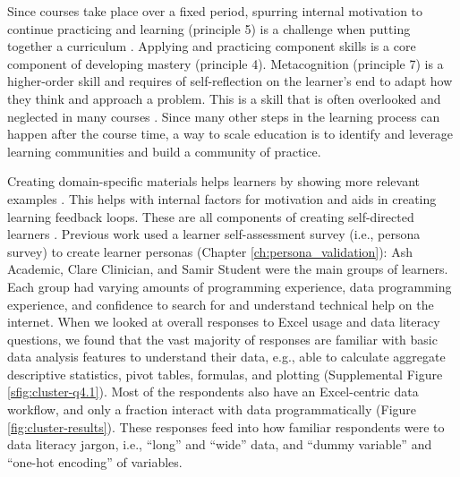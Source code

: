 \documentclass[030-workshop.tex]{subfiles}
\begin{document}
    Since courses take place over a fixed period,
    spurring internal motivation to continue practicing and learning (principle 5) is a challenge when putting together a curriculum
    \cite{ambrose2010learning}.
    Applying and practicing component skills is a core component of developing mastery (principle 4).
    Metacognition (principle 7) is a higher-order skill and requires of self-reflection on the learner's end
    to adapt how they think and approach a problem.
    This is a skill that is often overlooked and neglected in many courses
    \cite{ambrose2010learning}.
    Since many other steps in the learning process can happen after the course time,
    a way to scale education is to identify and leverage learning communities
    and build a community of practice. %

    Creating domain-specific materials helps learners by showing more relevant examples
    \cite{ambrose2010learning, Koch2016, wilson2019teaching, krossDemocratizationDataScience2020}.
    This helps with internal factors for motivation and aids in creating learning feedback loops.
    These are all components of creating self-directed learners
    \cite{ambrose2010learning, Koch2016, wilson2019teaching, krossDemocratizationDataScience2020}.
    Previous work used a learner self-assessment survey (i.e., persona survey) to create learner personas
    (Chapter \ref{ch:persona_validation}):
    Ash Academic, Clare Clinician, and Samir Student were the main groups of learners.
    Each group had varying amounts of
    programming experience, data programming experience, and
    confidence to search for and understand technical help on the internet.
    When we looked at overall responses to Excel usage and data literacy questions,
    we found that the vast majority of responses are familiar with basic data analysis features to understand their data,
    e.g., able to calculate aggregate descriptive statistics,
    pivot tables,
    formulas,
    and plotting
    (Supplemental Figure \ref{sfig:cluster-q4.1}).
    Most of the respondents also have an Excel-centric data workflow,
    and only a fraction interact with data programmatically
    (Figure \ref{fig:cluster-results}).
    These responses feed into how familiar respondents were to data literacy jargon, i.e., ``long'' and ``wide'' data,
    and ``dummy variable'' and ``one-hot encoding'' of variables.
\end{document}
